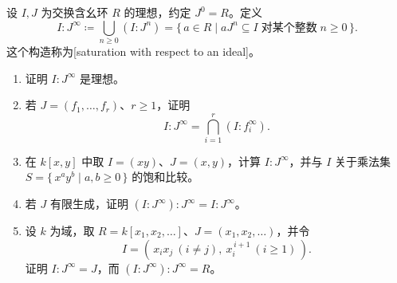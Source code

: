 \begin{exercise}\label{b1:ex:13-15}
	设 \(I,J\) 为交换含幺环 \(R\) 的理想，约定 \(J^0=R\)。定义
	\[
		I:J^\infty\coloneqq\bigcup_{n\geq0}(I:J^n) =\{\,a\in R\mid aJ^n\subseteq I\;\text{对某个整数}\;n\geq0\,\}.
	\]
	这个构造称为[saturation with respect to an ideal]。
	\begin{enumerate}
		\item 证明 \(I:J^\infty\) 是理想。
		\item 若 \(J=(f_1,\ldots,f_r)\)、\(r\geq1\)，证明
			\[
				I:J^\infty=\bigcap_{i=1}^{r}(I:f_i^\infty).
			\]
		\item 在 \(k[x,y]\) 中取 \(I=(xy)\)、\(J=(x,y)\)，计算 \(I:J^\infty\)，并与 \(I\) 关于乘法集 \(S=\{\,x^ay^b\mid a,b\geq0\,\}\) 的饱和比较。
		\item 若 \(J\) 有限生成，证明 \((I:J^\infty):J^\infty=I:J^\infty\)。
		\item 设 \(k\) 为域，取 \(R=k[x_1,x_2,\ldots]\)、\(J=(x_1,x_2,\ldots)\)，并令
			\[
				I=(\,x_ix_j\ (i\ne j),\ x_i^{\,i+1}\ (i\ge1)\,).
			\]
			证明 \(I:J^\infty=J\)，而 \((I:J^\infty):J^\infty=R\)。
	\end{enumerate}
\end{exercise}
